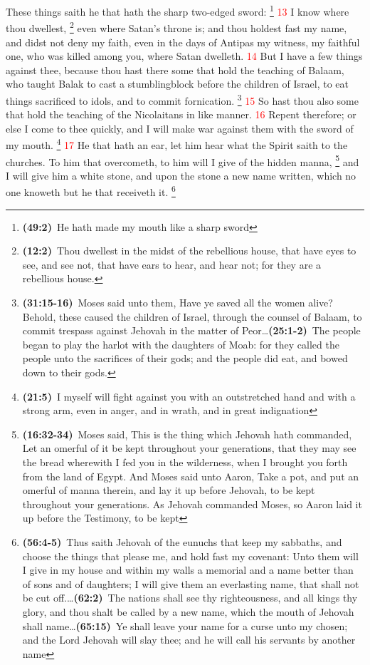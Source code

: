 \documentclass[12pt,twoside]{memoir}
\newcommand{\cbibleref}[3]{\textbf{\ibibleverse[textit]{#1}(#2)}\ {#3}}
\newcommand{\cbiblechvs}[3]{\textbf{\ibiblechvs[textit]{#1}(#2)}\ {#3}}
\newcommand{\cbiblefoot}[3]{\footnote{\cbibleref{#1}{#2}{#3}}}
\newcommand{\cbiblefootduosb}[5]{\footnote{\cbibleref{#1}{#2}{#3}\ldots \cbiblechvs{#1}{#4}{#5}}} %
\newcommand{\cbiblefoottriosb}[7]{\footnote{\cbibleref{#1}{#2}{#3}\ldots \cbiblechvs{#1}{#4}{#5}\ldots \cbiblechvs{#1}{#6}{#7}}}
\newcommand{\vnum}[1]{\textcolor{red}{\normalsize{#1}}}
\begin{document}
These things saith he that hath the sharp two-edged sword:%
	\cbiblefoot{Isaiah}{49:2}{He hath made my mouth like a sharp sword}%
\vnum{13} I know where thou dwellest,%
	\cbiblefoot{Ezekiel}{12:2}{Thou dwellest in the midst of the rebellious house, that have eyes to see, and see not, that have ears to hear, and hear not; for they are a rebellious house.}
 even where Satan’s throne is; and thou holdest fast my name, and didst not deny my faith, even in the days of Antipas my witness, my faithful one, who was killed among you, where Satan dwelleth. %
\vnum{14} But I have a few things against thee, because thou hast there some that hold the teaching of Balaam, who taught Balak to cast a stumblingblock before the children of Israel, to eat things sacrificed to idols, and to commit fornication.%
		\cbiblefootduosb{Numbers}{31:15-16}{Moses said unto them, Have ye saved all the women alive? Behold, these caused the children of Israel, through the counsel of Balaam, to commit trespass against Jehovah in the matter of Peor}%
								{25:1-2}{The people began to play the harlot with the daughters of Moab: for they called the people unto the sacrifices of their gods; and the people did eat, and bowed down to their gods.}
\vnum{15} So hast thou also some that hold the teaching of the Nicolaitans in like manner. %
\vnum{16} Repent therefore; or else I come to thee quickly, and I will make war against them with the sword of my mouth.%
	\cbiblefoot{Jeremiah}{21:5}{I myself will fight against you with an outstretched hand and with a strong arm, even in anger, and in wrath, and in great indignation}
\vnum{17} He that hath an ear, let him hear what the Spirit saith to the churches. To him that overcometh, to him will I give of the hidden manna,%
	\cbiblefoot{Exodus}{16:32-34}{Moses said, This is the thing which Jehovah hath commanded, Let an omerful of it be kept throughout your generations, that they may see the bread wherewith I fed you in the wilderness, when I brought you forth from the land of Egypt. And Moses said unto Aaron, Take a pot, and put an omerful of manna therein, and lay it up before Jehovah, to be kept throughout your generations. As Jehovah commanded Moses, so Aaron laid it up before the Testimony, to be kept} 
and I will give him a white stone, and upon the stone a new name written, which no one knoweth but he that receiveth it.
	\cbiblefoottriosb{Isaiah}{56:4-5}{Thus saith Jehovah of the eunuchs that keep my sabbaths, and choose the things that please me, and hold fast my covenant: Unto them will I give in my house and within my walls a memorial and a name better than of sons and of daughters; I will give them an everlasting name, that shall not be cut off.}%
					{62:2}{The nations shall see thy righteousness, and all kings thy glory, and thou shalt be called by a new name, which the mouth of Jehovah shall name}
					{65:15}{Ye shall leave your name for a curse unto my chosen; and the Lord Jehovah will slay thee; and he will call his servants by another name}
\end{document}
